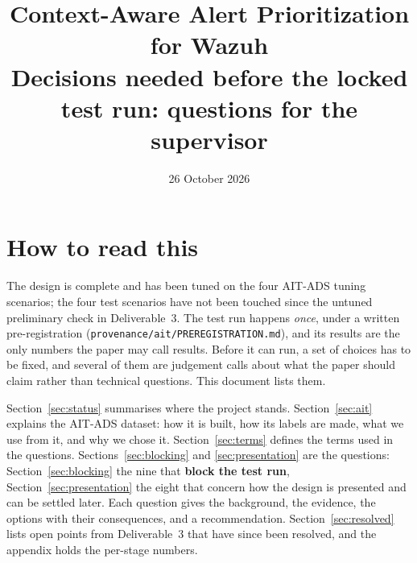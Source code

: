\documentclass[10.5pt,a4paper]{article}
\title{\textbf{Context-Aware Alert Prioritization for Wazuh}\\[2pt]
\large Decisions needed before the locked test run: questions for the supervisor}
\date{26 October 2026}
\author{}
\begin{document}
\maketitle
\vspace{-2.5em}

\section*{How to read this}

The design is complete and has been tuned on the four AIT-ADS tuning scenarios; the four test scenarios have not been touched since the untuned preliminary check in Deliverable~3. The test run happens \emph{once}, under a written pre-registration (\texttt{provenance/ait/PREREGISTRATION.md}), and its results are the only numbers the paper may call results. Before it can run, a set of choices has to be fixed, and several of them are judgement calls about what the paper should claim rather than technical questions. This document lists them.

Section~\ref{sec:status} summarises where the project stands. Section~\ref{sec:ait} explains the AIT-ADS dataset: how it is built, how its labels are made, what we use from it, and why we chose it. Section~\ref{sec:terms} defines the terms used in the questions. Sections~\ref{sec:blocking} and \ref{sec:presentation} are the questions: Section~\ref{sec:blocking} the nine that \textbf{block the test run}, Section~\ref{sec:presentation} the eight that concern how the design is presented and can be settled later. Each question gives the background, the evidence, the options with their consequences, and a recommendation. Section~\ref{sec:resolved} lists open points from Deliverable~3 that have since been resolved, and the appendix holds the per-stage numbers.
\end{document}
